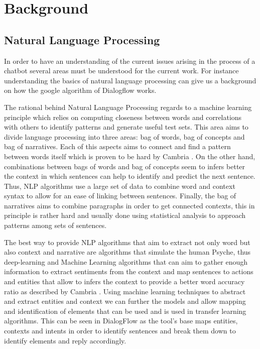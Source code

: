 \chapter{Background}
\section{Natural Language Processing}
In order to have an understanding of the current issues arising in the process of a chatbot several areas must be understood for the current work. For instance understanding the basics of natural language processing can give us a background on how the google algorithm of Dialogflow works.

The rational behind Natural Language Processing regards to a machine learning principle which relies on computing closeness between words and correlations with others to identify patterns and generate useful test sets. This area aims to divide language processing into three areas: bag of words, bag of concepts and bag of narratives. Each of this aspects aims to connect and find a pattern between words itself which is proven to be hard by Cambria \cite{nlp_reference}. On the other hand, combinations between bags of words and bag of concepts seem to infers better the context in which sentences can help to identify and predict the next sentence. Thus, NLP algorithms use a large set of data to combine word and context syntax to allow for an ease of linking between sentences. Finally, the bag of narratives aims to combine paragraphs in order to get connected contexts, this in principle is rather hard and usually done using statistical analysis to approach patterns among sets of sentences. 

The best way to provide NLP algorithms that aim to extract not only word but also context and narrative are algorithms that simulate the human Psyche, thus deep-learning and Machine Learning algorithms that can aim to gather enough information to extract sentiments from the context and map sentences to actions and entities that allow to infers the context to provide a better word accuracy ratio as described by Cambria \cite{nlp_reference}. Using machine learning techniques to abstract and extract entities and context we can further the models and allow mapping and identification of elements that can be used and is used in transfer learning algorithms. This can be seen in DialogFlow as the tool's base maps entities, contexts and intents in order to identify sentences and break them down to identify elements and reply accordingly.

